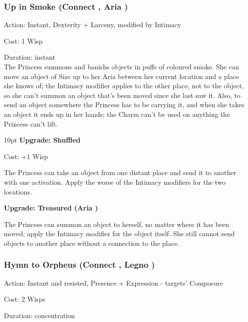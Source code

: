 \subsubsection*{Up in Smoke (Connect \textbullet\textbullet\textbullet, Aria \textbullet\textbullet\textbullet)}

\noindent Action: Instant, Dexterity + Larceny, modified by Intimacy

\noindent Cost: 1 Wisp

\noindent Duration: instant \\

\noindent The Princess summons and banishs objects in puffs of coloured smoke. She can move an object of Size up to her Aria between her current location and a place she knows of; the Intimacy modifier applies to the other place, not to the object, so she can't summon an object that's been moved since she last saw it. Also, to send an object somewhere the Princess has to be carrying it, and when she takes an object it ends up in her hands; the Charm can't be used on anything the Princess can't lift.

\begin{myindentpar}{10pt} \textbf{Upgrade: Shuffled}

\noindent Cost: +1 Wisp

The Princess can take an object from one distant place and send it to another with one activation. Apply the worse of the Intimacy modifiers for the two locations.

\textbf{Upgrade: Treasured (Aria \textbullet\textbullet\textbullet\textbullet)}

The Princess can summon an object to herself, no matter where it has been moved; apply the Intimacy modifier for the object itself. She still cannot send objects to another place without a connection to the place.\end{myindentpar} 

\subsubsection*{Hymn to Orpheus (Connect \textbullet\textbullet\textbullet, Legno \textbullet\textbullet)}

\noindent Action: Instant and resisted, Presence + Expression - targets' Composure

\noindent Cost: 2 Wisps

\noindent Duration: concentration \\

